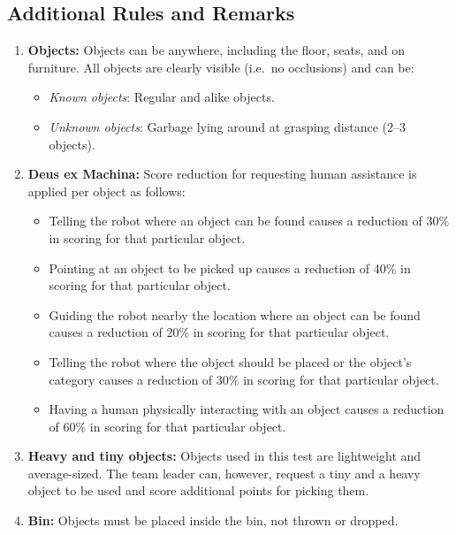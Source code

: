 \subsection{Additional Rules and Remarks}
\begin{enumerate}[nosep]
	\item \textbf{Objects:}
	Objects can be anywhere, including the floor, seats, and on furniture.
	All objects are clearly visible (i.e.~no occlusions) and can be:
	\begin{itemize}[nosep]
		\item\textit{Known objects}: Regular and alike objects.
		\item\textit{Unknown objects}: Garbage lying around at grasping distance (2--3 objects).
	\end{itemize}

	\item \textbf{Deus ex Machina:} Score reduction for requesting human assistance is applied per object as follows:
	\begin{itemize}[nosep]
		\item Telling the robot where an object can be found causes a reduction of 30\% in scoring for that particular object.

		\item Pointing at an object to be picked up causes a reduction of 40\% in scoring for that particular object.

		\item Guiding the robot nearby the location where an object can be found causes a reduction of 20\% in scoring for that particular object.

		\item Telling the robot where the object should be placed or the object's category causes a reduction of 30\% in scoring for that particular object.

		\item Having a human physically interacting with an object causes a reduction of 60\% in scoring for that particular object.
	\end{itemize}

	\item \textbf{Heavy and tiny objects:} Objects used in this test are lightweight and average-sized.
	The team leader can, however, request a tiny and a heavy object to be used and score additional points for picking them.

	\item \textbf{Bin:} Objects must be placed inside the bin, not thrown or dropped.
\end{enumerate}

